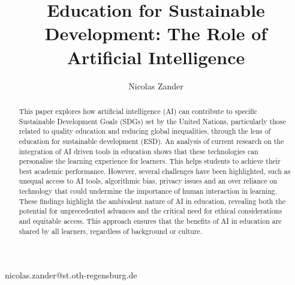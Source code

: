 \documentclass[]{lni}
\begin{document}
\title[]{Education for Sustainable Development: The Role of Artificial Intelligence}

\author[1]{Nicolas Zander}{nicolas.zander@st.oth-regensburg.de}{}

\maketitle

\begin{abstract}

This paper explores how artificial intelligence (AI) can contribute to specific Sustainable Development Goals (SDGs) set by the United Nations, 
particularly those related to quality education and reducing global inequalities, through the lens of education for sustainable development (ESD).
An analysis of current research on the integration of AI driven tools in education shows that these technologies can personalise the learning experience for learners. 
This helps students to achieve their best academic performance. However, several challenges have been highlighted,
such as unequal access to AI tools, algorithmic bias, privacy issues and an over reliance on technology that could undermine the importance of human interaction in learning. 
These findings highlight the ambivalent nature of AI in education, revealing both the potential for unprecedented advances and the critical need for ethical considerations and
equitable access. This approach ensures that the benefits of AI in education are shared by all learners, regardless of background or culture.
\end{abstract}



\end{document}
